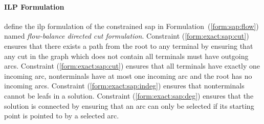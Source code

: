  \paragraph{ILP Formulation}
 \citet{gamrath2017scip} define the \gls{ilp} formulation of the constrained \gls{sap} in Formulation~(\ref{form:sap:flow})
 named \textit{flow-balance directed cut formulation}. Constraint (\ref{form:exact:sap:cut}) ensures that there exists a
  path from the root to any terminal by ensuring that any
 cut in the graph which does not contain all terminals must have outgoing arcs. Constraint (\ref{form:exact:sap:cut})
 ensures that all terminals have exactly one incoming arc, nonterminals have at most one incoming arc and the root has
 no incoming arcs. Constraint (\ref{form:exact:sap:indeg}) ensures that nonterminals cannot be leafs in a solution.
 Constraint (\ref{form:exact:sap:deg}) ensures that the solution is connected by ensuring that an arc can only be selected
 if its starting point is pointed to by a selected arc.


